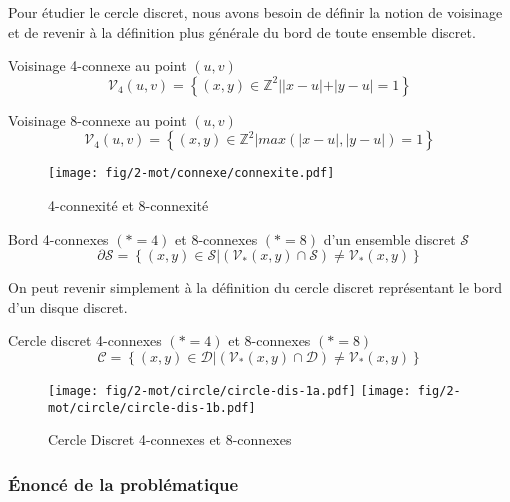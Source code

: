 Pour étudier le cercle discret, nous avons besoin de définir la notion de voisinage et de revenir à la définition plus générale du bord de toute ensemble discret.\\

\begin{Definition}{Voisinage 4-connexe au point $(u,v)$}
\label{def:vois-4}
  $$\mathcal{V}_4(u,v) =  \left\{ (x,y) \in \mathbb{Z}^{2} |  |x-u|+|y-u| = 1 \right\}$$
\end{Definition}

\begin{Definition}{Voisinage 8-connexe au point $(u,v)$}
\label{def:vois-8}
  $$\mathcal{V}_4(u,v) =  \left\{ (x,y) \in \mathbb{Z}^{2} |  max(|x-u|,|y-u|) = 1 \right\}$$
\end{Definition}

\begin{figure}[H]
  \centering
  \texttt{[image: fig/2-mot/connexe/connexite.pdf]}
  \caption{4-connexité et 8-connexité}
\end{figure}

\begin{Definition}{Bord 4-connexes $(*=4)$ et 8-connexes $(*=8)$ d'un ensemble discret $\mathcal{S}$}
\label{def:bord-ens}
  $$ \partial \mathcal{S} =  \left\{ (x,y) \in \mathcal{S} | \left( \mathcal{V}_{*}(x,y) \cap \mathcal{S} \right) \neq \mathcal{V}_{*}(x,y) \right\}$$
\end{Definition}

On peut revenir simplement à la définition du cercle discret représentant le bord d'un disque discret.

\begin{Definition}{Cercle discret 4-connexes $(*=4)$ et 8-connexes $(*=8)$}
\label{def:cer-dis}
  $$ \mathcal{C} =  \left\{ (x,y) \in \mathcal{D} | \left( \mathcal{V}_{*}(x,y) \cap \mathcal{D} \right) \neq \mathcal{V}_{*}(x,y) \right\}$$
\end{Definition}

\begin{figure}[H]
  \centering
  \texttt{[image: fig/2-mot/circle/circle-dis-1a.pdf]}
  \texttt{[image: fig/2-mot/circle/circle-dis-1b.pdf]}
  \caption{Cercle Discret 4-connexes et 8-connexes}
\end{figure}


\subsubsection{Énoncé de la problématique}


